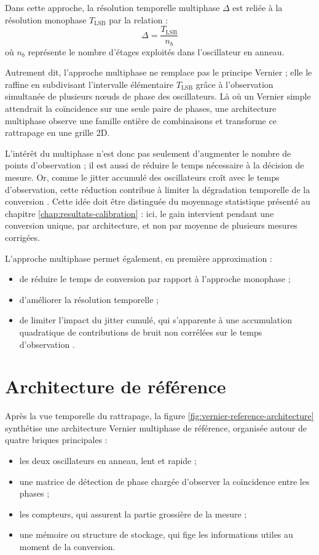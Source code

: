 Dans cette approche, la résolution temporelle multiphase $\Delta$ est reliée à la résolution monophase $T_{\mathrm{LSB}}$ par la relation :
\begin{equation}
    \Delta = \frac{T_{\mathrm{LSB}}}{n_b}
\end{equation}
où $n_b$ représente le nombre d’étages exploités dans l’oscillateur en anneau.

Autrement dit, l'approche multiphase ne remplace pas le principe Vernier ; elle le raffine en subdivisant l'intervalle élémentaire $T_{\mathrm{LSB}}$ grâce à l'observation simultanée de plusieurs nœuds de phase des oscillateurs. Là où un Vernier simple attendrait la coïncidence sur une seule paire de phases, une architecture multiphase observe une famille entière de combinaisons et transforme ce rattrapage en une grille 2D.

L'intérêt du multiphase n'est donc pas seulement d'augmenter le nombre de points d'observation ; il est aussi de réduire le temps nécessaire à la décision de mesure. Or, comme le jitter accumulé des oscillateurs croît avec le temps d'observation, cette réduction contribue à limiter la dégradation temporelle de la conversion \cite{annagrebah2021thesis}. Cette idée doit être distinguée du moyennage statistique présenté au chapitre \ref{chap:resultats-calibration} : ici, le gain intervient pendant une conversion unique, par architecture, et non par moyenne de plusieurs mesures corrigées.

L'approche multiphase permet également, en première approximation :
\begin{itemize}
    \item de réduire le temps de conversion par rapport à l’approche monophase ;
    \item d’améliorer la résolution temporelle ;
    \item de limiter l'impact du jitter cumulé, qui s'apparente à une accumulation quadratique de contributions de bruit non corrélées sur le temps d'observation \cite{annagrebah2021thesis}.
\end{itemize}

\section{Architecture de référence}

Après la vue temporelle du rattrapage, la figure \ref{fig:vernier-reference-architecture} synthétise une architecture Vernier multiphase de référence, organisée autour de quatre briques principales :
\begin{itemize}
    \item les deux oscillateurs en anneau, lent et rapide ;
    \item une matrice de détection de phase chargée d’observer la coïncidence entre les phases ;
    \item les compteurs, qui assurent la partie grossière de la mesure ;
    \item une mémoire ou structure de stockage, qui fige les informations utiles au moment de la conversion.
\end{itemize}


